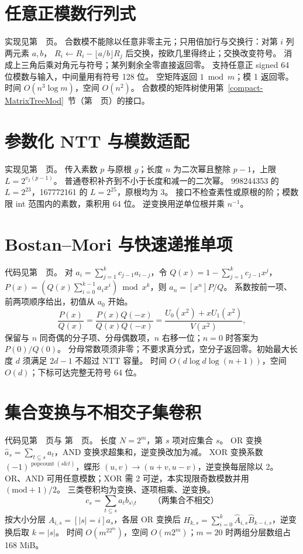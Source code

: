 \section{任意正模数行列式}\label{knowledge-det-mod}
实现见第~\pageref{compact-determinant_mod}~页。
合数模不能除以任意非零主元；只用倍加行与交换行：对第 $i$ 列两元素 $a,b$，
$R_i\leftarrow R_i-\lfloor a/b\rfloor R_j$ 后交换，按欧几里得终止；交换改变符号。
消成上三角后乘对角元与符号；某列剩余全零直接返回零。
支持任意正 signed 64 位模数与输入，中间量用有符号 128 位。
空矩阵返回 $1\bmod m$；模 1 返回零。时间 $O(n^3\log m)$，空间 $O(n^2)$。
合数模的矩阵树使用第~\ref{compact-MatrixTreeMod}~节（第~\pageref{compact-MatrixTreeMod}~页）的接口。

\clearpage
\section{参数化 NTT 与模数适配}\label{knowledge-ntt-moduli}
实现见第~\pageref{compact-NttConvolution}~页。
传入素数 $p$ 与原根 $g$；长度 $n$ 为二次幂且整除 $p-1$，上限 $L=2^{v_2(p-1)}$。
普通卷积补齐到不小于长度和减一的二次幂。
998244353 的 $L=2^{23}$，167772161 的 $L=2^{25}$，原根均为 3。
接口不检查素性或原根的阶；模数限 int 范围内的素数，乘积用 64 位。
逆变换用逆单位根并乘 $n^{-1}$。

\clearpage
\section{Bostan--Mori 与快速递推单项}\label{knowledge-bostan-mori}
代码见第~\pageref{compact-BostanMori}~页。
对 $a_i=\sum_{j=1}^k c_{j-1}a_{i-j}$，令
$Q(x)=1-\sum_{j=1}^k c_{j-1}x^j$，
$P(x)=(Q(x)\sum_{i=0}^{k-1}a_ix^i)\bmod x^k$，则 $a_n=[x^n]P/Q$。
系数按前一项、前两项顺序给出，初值从 $a_0$ 开始。
\[
 \frac{P(x)}{Q(x)}=\frac{P(x)Q(-x)}{Q(x)Q(-x)}
 =\frac{U_0(x^2)+xU_1(x^2)}{V(x^2)},
\]
保留与 $n$ 同奇偶的分子项、分母偶数项，$n$ 右移一位；$n=0$ 时答案为 $P(0)/Q(0)$。
分母常数项须非零；不要求真分式，空分子返回零。初始最大长度 $d$ 须满足 $2d-1$ 不超过 NTT 容量。
时间 $O(d\log d\log(n+1))$，空间 $O(d)$；下标可达完整无符号 64 位。

\clearpage
\section{集合变换与不相交子集卷积}\label{knowledge-subset-conv}
代码见第~\pageref{compact-SetConvolution}~页与
第~\pageref{compact-subset_convolution}~页。
长度 $N=2^m$，第 $s$ 项对应集合 $s$。
OR 变换 $\widehat a_s=\sum_{t\subseteq s}a_t$，AND 变换求超集和，逆变换改加为减。
XOR 变换系数 $(-1)^{\operatorname{popcount}(s\mathbin{\&}t)}$，蝶形 $(u,v)\to(u+v,u-v)$，逆变换每层除以 2。
OR、AND 可用任意模数；XOR 需 2 可逆，本实现限奇数模数并用 $(\mathrm{mod}+1)/2$。
三类卷积均为变换、逐项相乘、逆变换。
\[
 c_s=\sum_{t\subseteq s}a_t b_{s\setminus t}
 \qquad\text{（两集合不相交）}
\]
按大小分层 $A_{i,s}=[|s|=i]a_s$，各层 OR 变换后
$H_{k,s}=\sum_{i=0}^k\widehat A_{i,s}\widehat B_{k-i,s}$，逆变换后取 $k=|s|$。
时间 $O(m^22^m)$，空间 $O(m2^m)$；$m=20$ 时两组分层数组占 168 MiB。

